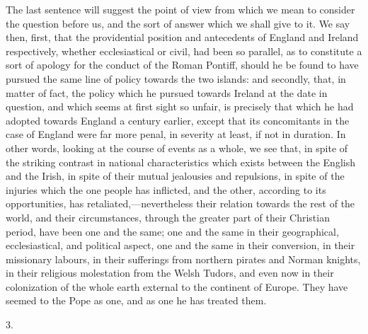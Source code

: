 The last sentence will suggest
the point of view from which we mean to consider the question before
us, and the sort of answer which we shall give to it. We say then,
first, that the providential position and antecedents of England and
Ireland respectively, whether ecclesiastical or civil, had been so
parallel, as to constitute a sort of apology for the conduct of the
Roman Pontiff, should he be found to have pursued the same line of
policy towards the two islands: and secondly, that, in matter of fact,
the policy which he pursued towards Ireland at the date in question,
and which seems at first sight so unfair, is precisely that which he
had adopted towards England a century earlier, except that its
concomitants in the case of England were far more penal, in severity
at least, if not in duration. In other words, looking at the course of
events as a whole, we see that, in spite of the striking contrast in
national characteristics which exists between the English and the
Irish, in spite of their mutual jealousies and repulsions, in spite of
the injuries which the one people has inflicted, and the other,
according to its opportunities, has retaliated,—nevertheless their
relation towards the rest of the world, and their circumstances,
through the greater part of their Christian period, have been one and
the same; one and the same in their geographical, ecclesiastical, and
political aspect, one and the same in their conversion, in their
missionary labours, in their sufferings from northern pirates and
Norman knights, in their religious molestation from the Welsh Tudors,
and even now in their colonization of the whole earth external to the
continent of Europe. They have seemed to the Pope as one, and as one
he has treated them.

3.

